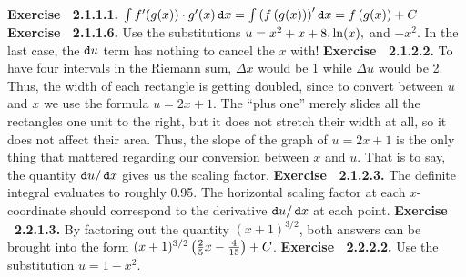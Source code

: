 \par 
 {\noindent \protect \bf  Exercise ~2.1.1.1.} $ \intop f'(g(x)) \cdot g'(x) \mathop {}\protect \tmspace  -\thinmuskip {.1667em}\protect \mathtt  {d}x = \intop \left (f\left (g(x)\right )\right )' \mathop {}\protect \tmspace  -\thinmuskip {.1667em}\protect \mathtt  {d}x= f\left (g(x)\right )+C$ \protect \newline  \protect \newline  
 {\noindent \protect \bf  Exercise ~2.1.1.6.} Use the substitutions $u=x^2+x+8, \protect \qopname  \relax o{ln}(x),$ and $-x^2$. In the last case, the $\mathop {}\protect \tmspace  -\thinmuskip {.1667em}\protect \mathtt  {d}u$ term has nothing to cancel the $x$ with! \protect \newline  \protect \newline  
 {\noindent \protect \bf  Exercise ~2.1.2.2.} To have four intervals in the Riemann sum, $\Delta x$ would be 1 while $\Delta u$ would be 2. Thus, the width of each rectangle is getting doubled, since to convert between $u$ and $x$ we use the formula $u=2x+1$. The ``plus one'' merely slides all the rectangles one unit to the right, but it does not stretch their width at all, so it does not affect their area. Thus, the slope of the graph of $u=2x+1$ is the only thing that mattered regarding our conversion between $x$ and $u$. That is to say, the quantity $\mathop {}\protect \tmspace  -\thinmuskip {.1667em}\protect \mathtt  {d}u/ \mathop {}\protect \tmspace  -\thinmuskip {.1667em}\protect \mathtt  {d}x$ gives us the scaling factor. \protect \newline  \protect \newline  
 {\noindent \protect \bf  Exercise ~2.1.2.3.} The definite integral evaluates to roughly 0.95. The horizontal scaling factor at each $x$-coordinate should correspond to the derivative $\mathop {}\protect \tmspace  -\thinmuskip {.1667em}\protect \mathtt  {d}u /\mathop {}\protect \tmspace  -\thinmuskip {.1667em}\protect \mathtt  {d}x$ at each point.  \protect \newline  \protect \newline  
 {\noindent \protect \bf  Exercise ~2.2.1.3.} By factoring out the quantity $(x+1)^{3/2}$, both answers can be brought into the form $(x+1)^{3/2}\left (\protect \frac  {2}{5}x-\protect \frac  {4}{15}\right )+C$. \protect \newline  \protect \newline  
 {\noindent \protect \bf  Exercise ~2.2.2.2.} Use the substitution $u=1-x^2$. \protect \newline  \protect \newline  
